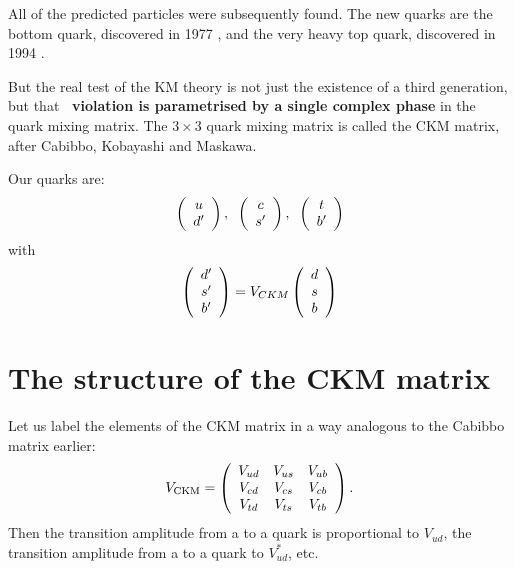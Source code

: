  All of the predicted particles were subsequently found. The new
 quarks are the bottom quark, discovered in 1977
 \cite{beautydiscovery}, and the very heavy top quark, discovered in
 1994 \cite{topdiscovery}.

 But the real test of the KM theory is not just the existence of a
 third generation, but that \textbf{\cp\ violation is parametrised by
 a single complex phase} in the quark mixing matrix. The $3\times 3$
 quark mixing matrix is called the CKM matrix, after Cabibbo,
 Kobayashi and Maskawa.

 Our quarks are:
\begin{equation}
 \left( \begin{array}{c} u \\ d^{\prime} \end{array} \right),\;\;  \left( \begin{array}{c} c \\ s^{\prime} \end{array} \right),\;\;  \left( \begin{array}{c} t \\ b^{\prime} \end{array} \right)
\end{equation}
 with
\begin{equation}
 \left( \begin{array}{c} d^{\prime} \\ s^{\prime} \\ b^{\prime}\end{array} \right) = V_{CKM} \left( \begin{array}{c} d \\ s \\ b\end{array} \right)
\end{equation}

\section{The structure of the CKM matrix}
 Let us label the elements of the CKM matrix in a way analogous to the
 Cabibbo matrix earlier:
\begin{equation}
\label{eq:th.b.ckmlabel}
V_{\mathrm{CKM}}= \left( \begin{array}{ccc}  V_{ud}  &  V_{us}  &  V_{ub}  \\ 
                        V_{cd}  &  V_{cs}  &  V_{cb}  \\ 
                        V_{td}  &  V_{ts}  &  V_{tb}  \end{array} \right)
.
\end{equation}
 Then the transition amplitude from a  to a  quark is
 proportional to $V_{ud}$, the transition amplitude from a  to
 a  quark to $V_{ud}^{\ast}$, etc.


